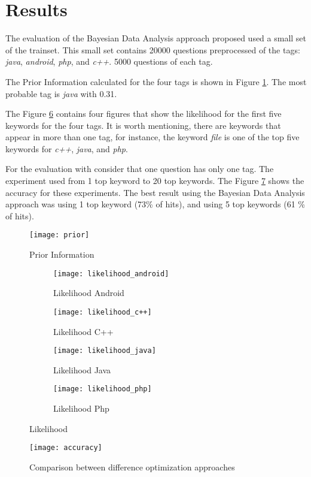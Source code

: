 \section{Results} \label{sec:results}

The evaluation of the Bayesian Data Analysis approach proposed used a small set of the trainset.
This small set contains 20000 questions preprocessed of the tags: \emph{java}, \emph{android}, \emph{php}, and \emph{c++}.
5000 questions of each tag.

The Prior Information calculated for the four tags is shown in Figure \ref{fig:prior}.
The most probable tag is \emph{java} with 0.31.

The Figure \ref{fig:likelihood} contains four figures that show the likelihood for the first five keywords for the four tags.
It is worth mentioning, there are keywords that appear in more than one tag, for instance, the keyword \emph{file} is one of the top five keywords for \emph{c++}, \emph{java}, and \emph{php}.

For the evaluation with consider that one question has only one tag.
The experiment used from 1 top keyword to 20 top keywords.
The Figure \ref{fig:accuracy} shows the accuracy for these experiments.
The best result using the Bayesian Data Analysis approach was using 1 top keyword (73\% of hits), and using 5 top keywords (61 \% of hits).

\begin{figure}[ht]
    \centering
    \texttt{[image: prior]}
    \caption{Prior Information}
    \label{fig:prior}
\end{figure}

\begin{figure}[H]
    \centering
    \begin{subfigure}[b]{.40\textwidth}
        \texttt{[image: likelihood\_android]}
        \caption{Likelihood Android}
        \label{fig:likelihood_android}
    \end{subfigure}
    \begin{subfigure}[b]{.40\textwidth}
        \texttt{[image: likelihood\_c++]}
        \caption{Likelihood C++}
        \label{fig:likelihood_c++}
    \end{subfigure}
    \begin{subfigure}[b]{.40\textwidth}
        \texttt{[image: likelihood\_java]}
        \caption{Likelihood Java}
        \label{fig:likelihood_java}
    \end{subfigure}
    \begin{subfigure}[b]{.40\textwidth}
        \texttt{[image: likelihood\_php]}
        \caption{Likelihood Php}
        \label{fig:likelihood_php}
    \end{subfigure}
    \caption{Likelihood}
    \label{fig:likelihood}
\end{figure}

\begin{figure}[H]
    \centering
    \texttt{[image: accuracy]}
    \caption{Comparison between difference optimization approaches}
    \label{fig:accuracy}
\end{figure}

